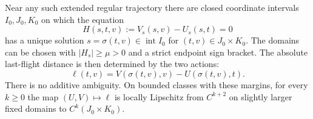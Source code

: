 \begin{proposition}
\label{prop:v77-cancellation}
Near any such extended regular trajectory there are closed coordinate
intervals $I_0,J_0,K_0$ on which the equation
\begin{equation}\label{eq:v77-matching}
 H(s,t,v):=V_s(s,v)-U_s(s,t)=0
\end{equation}
has a unique solution $s=\sigma(t,v)\in\operatorname{int}I_0$ for
$(t,v)\in J_0\times K_0$.  The domains can be chosen with
$|H_s|\ge\mu>0$ and a strict endpoint sign bracket.  The absolute
last-flight distance is then determined by the two actions:
\begin{equation}\label{eq:v77-distance-cancellation}
 \ell(t,v)=V(\sigma(t,v),v)-U(\sigma(t,v),t).
\end{equation}
There is no additive ambiguity.  On bounded classes with these margins,
for every $k\ge0$ the map $(U,V)\mapsto\ell$ is locally Lipschitz
from $C^{k+2}$ on slightly larger fixed domains to $C^k(J_0\times K_0)$.
\end{proposition}
